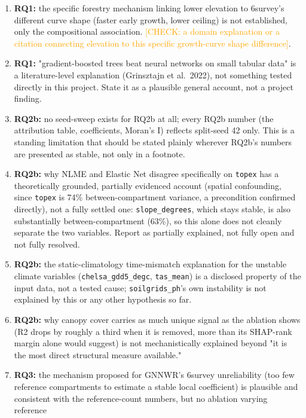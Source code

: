 \documentclass[11pt,a4paper]{report}
\newcommand{\chk}[1]{\textcolor{orange}{[CHECK: #1]}}
\begin{document}
\begin{enumerate}
\item \textbf{RQ1:} the specific forestry mechanism linking lower elevation to
  6survey's different curve shape (faster early growth, lower ceiling) is not
  established, only the compositional association. \chk{a domain explanation or a
  citation connecting elevation to this specific growth-curve shape difference}.
\item \textbf{RQ1:} "gradient-boosted trees beat neural networks on small tabular
  data" is a literature-level explanation (Grinsztajn et al.\ 2022), not something
  tested directly in this project. State it as a plausible general account, not a
  project finding.
\item \textbf{RQ2b:} no seed-sweep exists for RQ2b at all; every RQ2b number (the
  attribution table, coefficients, Moran's I) reflects split-seed 42 only. This is a
  standing limitation that should be stated plainly wherever RQ2b's numbers are
  presented as stable, not only in a footnote.
\item \textbf{RQ2b:} why NLME and Elastic Net disagree specifically on \texttt{topex}
  has a theoretically grounded, partially evidenced account (spatial confounding, since
  \texttt{topex} is 74\% between-compartment variance, a precondition confirmed
  directly), not a fully settled one: \texttt{slope\_degrees}, which stays stable, is
  also substantially between-compartment (63\%), so this alone does not cleanly
  separate the two variables. Report as partially explained, not fully open and not
  fully resolved.
\item \textbf{RQ2b:} the static-climatology time-mismatch explanation for the unstable
  climate variables (\texttt{chelsa\_gdd5\_degc}, \texttt{tas\_mean}) is a disclosed
  property of the input data, not a tested cause; \texttt{soilgrids\_ph}'s own
  instability is not explained by this or any other hypothesis so far.
\item \textbf{RQ2b:} why canopy cover carries as much unique signal as the ablation
  shows (R2 drops by roughly a third when it is removed, more than its SHAP-rank
  margin alone would suggest) is not mechanistically explained beyond "it is the most
  direct structural measure available."
\item \textbf{RQ3:} the mechanism proposed for GNNWR's 6survey unreliability (too few
  reference compartments to estimate a stable local coefficient) is plausible and
  consistent with the reference-count numbers, but no ablation varying reference

\end{enumerate}
\end{document}
